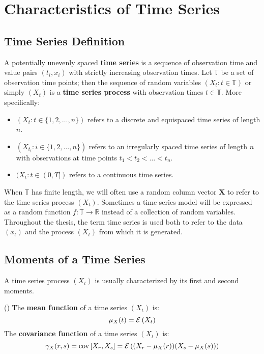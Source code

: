 
\chapter{Characteristics of Time Series}\label{ch:characteristics-of-time-series}


\section{Time Series Definition}\label{sec:time-series-definition}

A potentially unevenly spaced \textbf{time series} is a sequence of observation
time and value pairs $(t_i, x_i)$ with strictly increasing observation times. Let
$\mathbb{T}$ be a set of observation time points; then the sequence of random
variables $(X_t: t \in \mathbb{T})$ or simply $(X_t)$ is a \textbf{time series
process} with observation times $t \in \mathbb{T}$. More specifically:

\begin{itemize}
    \item $(X_t: t \in \{1, 2, \dots, n\})$ refers to a discrete and equispaced
    time series of length $n$.
    \item $(X_{t_i}: i \in \{1, 2, \dots, n\})$ refers to an irregularly spaced
    time series of length $n$ with observations at time points $t_1 < t_2 < \dots
    < t_n$.
    \item $(X_{t}: t \in (0, T])$ refers to a continuous time series.
\end{itemize}

When $\mathbb{T}$ has finite length, we will often use a random column vector
$\mathbf{X}$ to refer to the time series process $(X_t)$. Sometimes a time series
model will be expressed as a random function $f: \mathbb{T} \to \mathbb{R}$ instead
of a collection of random variables. Throughout the thesis, the term time series
is used both to refer to the data $(x_t)$ and the process $(X_t)$ from which it is
generated.

\section{Moments of a Time Series}\label{sec:time_series_moments}

A time series process $(X_t)$ is usually characterized by its first and second
moments.

\begin{definition}(\citeauthor{brockwell_introduction_2016})\label{def:time_series_moments}
    The \textbf{mean function} of a time series $(X_t)$ is:
    \[
        \mu_X(t) = \ERW{X_t}
    \]
    The \textbf{covariance function} of a time series $(X_t)$ is:
    \[
        \gamma_X(r,s) = \COV{X_r, X_s} = \ERW{(X_r - \mu_X(r))(X_s-\mu_X(s))}
    \]
\end{definition}


